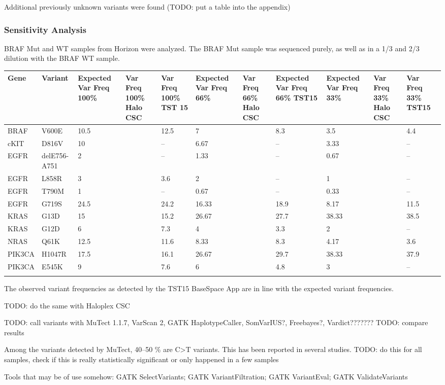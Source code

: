 Additional previously unknown variants were found (TODO: put a table into the appendix)

\subsubsection{Sensitivity Analysis}
BRAF Mut and WT samples from Horizon were analyzed. The BRAF Mut sample was
sequenced purely, as well as in a 1/3 and 2/3 dilution with the BRAF WT sample.

\begin{table}
\begin{tabular}{p{3.5cm} p{1cm} p{1cm}}\\
\hline
Gene & Variant & Expected Var Freq 100\% &  Var Freq 100\% Halo CSC &  Var Freq 100\% TST 15 & Expected Var Freq 66\% &  Var Freq 66\% Halo CSC & Expected Var Freq 66\% TST15 & Expected Var Freq 33\% & Var Freq 33\% Halo CSC & Var Freq 33\% TST15 \\
\hline
BRAF & V600E & 10.5 & & 12.5 & 7 & & 8.3 & 3.5 & & 4.4 \\
cKIT & D816V & 10 & & -- & 6.67 & & -- & 3.33 & & -- \\
EGFR & delE756-A751 & 2 & & -- & 1.33 & & -- & 0.67 & & -- \\
EGFR & L858R & 3 & & 3.6 & 2 & & -- & 1 & & -- \\
EGFR & T790M & 1 & & -- & 0.67 & & -- & 0.33 & & -- \\
EGFR & G719S & 24.5 & & 24.2 & 16.33 & & 18.9 & 8.17 & & 11.5 \\
KRAS & G13D & 15 & & 15.2 & 26.67 & & 27.7 & 38.33 & & 38.5 \\
KRAS & G12D & 6 & & 7.3 & 4 & & 3.3 & 2 & & -- \\
NRAS & Q61K & 12.5 & & 11.6 & 8.33 & & 8.3 & 4.17 & & 3.6 \\
PIK3CA & H1047R & 17.5 & & 16.1 & 26.67 & & 29.7 & 38.33 & & 37.9 \\
PIK3CA & E545K & 9 & & 7.6 & 6 & & 4.8 & 3 & & -- \\
\label{horizon_analysis}
\end{tabular}
\end{table}

The observed variant frequencies as detected by the TST15 BaseSpace App are
in line with the expected variant frequencies.

TODO: do the same with Haloplex CSC

TODO: call variants with MuTect 1.1.7, VarScan 2, GATK HaplotypeCaller, SomVarIUS?, Freebayes?, Vardict???????
TODO: compare results

Among the variants detected by MuTect, 40--50 \% are C>T variants. This has been reported in several studies.
TODO: do this for all samples, check if this is really statistically significant or only happened in a few samples

Tools that may be of use somehow: GATK SelectVariants; GATK VariantFiltration; GATK VariantEval; GATK ValidateVariants

